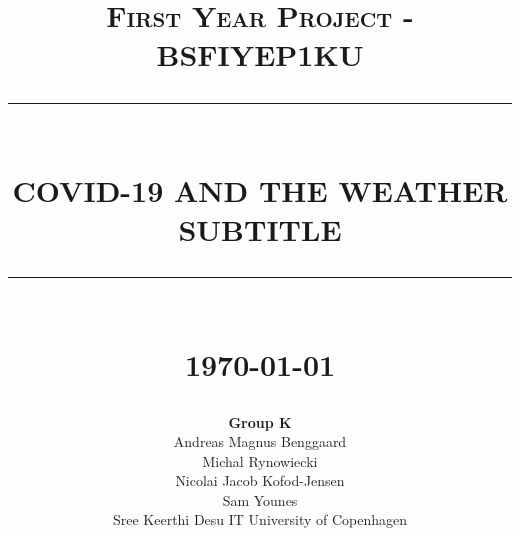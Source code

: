 \documentclass[11pt]{article}
\newcommand{\HRule}[1]{\rule{\linewidth}{#1}}
\begin{document}
% 
\title{ \normalsize \textsc{First Year Project - BSFIYEP1KU}
		\\ [2.0cm]
		\HRule{0.5pt} \\
		\LARGE \textbf{\uppercase{COVID-19 and the Weather}\\
		\normalsize{\textsc{SUBTITLE}}}
		\HRule{2pt} \\ [0.5cm]
		\normalsize \today \vspace*{5\baselineskip}}

\date{}

\author{
		\textbf{Group K} \\ 
		Andreas Magnus Benggaard\\ 
		Michal Rynowiecki \\ 
		Nicolai Jacob Kofod-Jensen \\ 
		Sam Younes \\ 
		Sree Keerthi Desu 
		\hline
		IT University of Copenhagen \\
		}

\maketitle
\newpage

\tableofcontents
\newpage

\sectionfont{\scshape}











\newpage
{}

\end{document}
